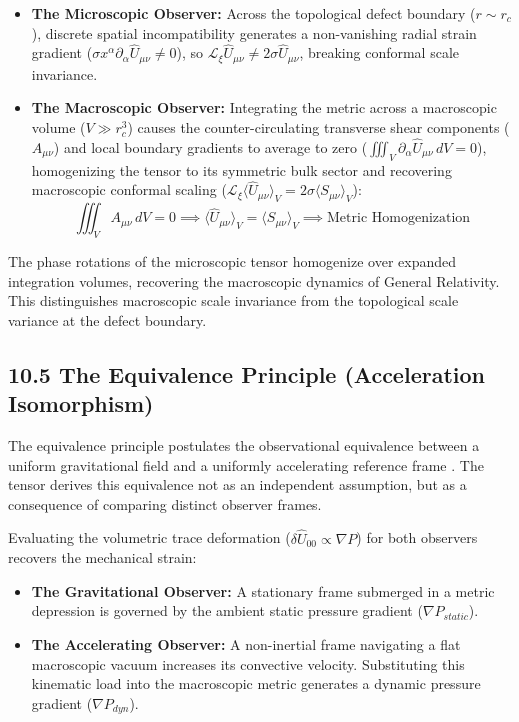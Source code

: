 \begin{itemize}
    \item \textbf{The Microscopic Observer:} Across the topological defect boundary ($r \sim r_c$), discrete spatial incompatibility generates a non-vanishing radial strain gradient ($\sigma x^\alpha \partial_\alpha \hat{U}_{\mu\nu} \neq 0$), so $\mathcal{L}_\xi \hat{U}_{\mu\nu} \neq 2\sigma \hat{U}_{\mu\nu}$, breaking conformal scale invariance. 
    \item \textbf{The Macroscopic Observer:} Integrating the metric across a macroscopic volume ($V \gg r_c^3$) causes the counter-circulating transverse shear components ($A_{\mu\nu}$) and local boundary gradients to average to zero ($\iiint_V \partial_\alpha \hat{U}_{\mu\nu} \, dV = 0$), homogenizing the tensor to its symmetric bulk sector and recovering macroscopic conformal scaling ($\mathcal{L}_\xi \langle \hat{U}_{\mu\nu} \rangle_V = 2\sigma \langle S_{\mu\nu} \rangle_V$): 
    \begin{equation}
        \iiint_V A_{\mu\nu} \, dV = 0 \implies \langle \hat{U}_{\mu\nu} \rangle_V = \langle S_{\mu\nu} \rangle_V \implies \text{Metric Homogenization}  %
    \end{equation}
\end{itemize}
The phase rotations of the microscopic tensor homogenize over expanded integration volumes, recovering the macroscopic dynamics of General Relativity. This distinguishes macroscopic scale invariance from the topological scale variance at the defect boundary.

\subsection*{10.5 The Equivalence Principle (Acceleration Isomorphism)}
The equivalence principle postulates the observational equivalence between a uniform gravitational field and a uniformly accelerating reference frame \cite{Einstein1907}. The tensor derives this equivalence not as an independent assumption, but as a consequence of comparing distinct observer frames.

Evaluating the volumetric trace deformation ($\delta \hat{U}_{00} \propto \nabla P$) for both observers recovers the mechanical strain: 
\begin{itemize}
    \item \textbf{The Gravitational Observer:} A stationary frame submerged in a metric depression is governed by the ambient static pressure gradient ($\nabla P_{static}$).
    \item \textbf{The Accelerating Observer:} A non-inertial frame navigating a flat macroscopic vacuum increases its convective velocity. Substituting this kinematic load into the macroscopic metric generates a dynamic pressure gradient ($\nabla P_{dyn}$).
\end{itemize}

